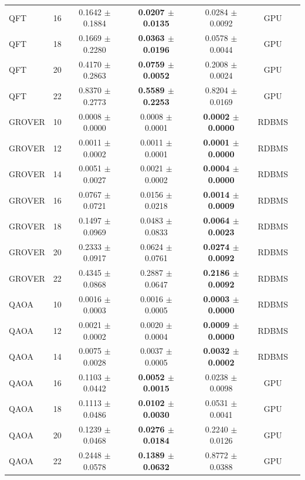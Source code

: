 \begin{table}[htbp]
\begin{tabular}{lcccccc}
QFT & 16 & 0.1642 $\pm$ 0.1884 & \textbf{0.0207 $\pm$ 0.0135} & 0.0284 $\pm$ 0.0092 & GPU \\
QFT & 18 & 0.1669 $\pm$ 0.2280 & \textbf{0.0363 $\pm$ 0.0196} & 0.0578 $\pm$ 0.0044 & GPU \\
QFT & 20 & 0.4170 $\pm$ 0.2863 & \textbf{0.0759 $\pm$ 0.0052} & 0.2008 $\pm$ 0.0024 & GPU \\
QFT & 22 & 0.8370 $\pm$ 0.2773 & \textbf{0.5589 $\pm$ 0.2253} & 0.8204 $\pm$ 0.0169 & GPU \\
GROVER & 10 & 0.0008 $\pm$ 0.0000 & 0.0008 $\pm$ 0.0001 & \textbf{0.0002 $\pm$ 0.0000} & RDBMS \\
GROVER & 12 & 0.0011 $\pm$ 0.0002 & 0.0011 $\pm$ 0.0001 & \textbf{0.0001 $\pm$ 0.0000} & RDBMS \\
GROVER & 14 & 0.0051 $\pm$ 0.0027 & 0.0021 $\pm$ 0.0002 & \textbf{0.0004 $\pm$ 0.0000} & RDBMS \\
GROVER & 16 & 0.0767 $\pm$ 0.0721 & 0.0156 $\pm$ 0.0218 & \textbf{0.0014 $\pm$ 0.0009} & RDBMS \\
GROVER & 18 & 0.1497 $\pm$ 0.0969 & 0.0483 $\pm$ 0.0833 & \textbf{0.0064 $\pm$ 0.0023} & RDBMS \\
GROVER & 20 & 0.2333 $\pm$ 0.0917 & 0.0624 $\pm$ 0.0761 & \textbf{0.0274 $\pm$ 0.0092} & RDBMS \\
GROVER & 22 & 0.4345 $\pm$ 0.0868 & 0.2887 $\pm$ 0.0647 & \textbf{0.2186 $\pm$ 0.0092} & RDBMS \\
QAOA & 10 & 0.0016 $\pm$ 0.0003 & 0.0016 $\pm$ 0.0005 & \textbf{0.0003 $\pm$ 0.0000} & RDBMS \\
QAOA & 12 & 0.0021 $\pm$ 0.0002 & 0.0020 $\pm$ 0.0004 & \textbf{0.0009 $\pm$ 0.0000} & RDBMS \\
QAOA & 14 & 0.0075 $\pm$ 0.0028 & 0.0037 $\pm$ 0.0005 & \textbf{0.0032 $\pm$ 0.0002} & RDBMS \\
QAOA & 16 & 0.1103 $\pm$ 0.0442 & \textbf{0.0052 $\pm$ 0.0015} & 0.0238 $\pm$ 0.0098 & GPU \\
QAOA & 18 & 0.1113 $\pm$ 0.0486 & \textbf{0.0102 $\pm$ 0.0030} & 0.0531 $\pm$ 0.0041 & GPU \\
QAOA & 20 & 0.1239 $\pm$ 0.0468 & \textbf{0.0276 $\pm$ 0.0184} & 0.2240 $\pm$ 0.0126 & GPU \\
QAOA & 22 & 0.2448 $\pm$ 0.0578 & \textbf{0.1389 $\pm$ 0.0632} & 0.8772 $\pm$ 0.0388 & GPU \\

\bottomrule
\end{tabular}
\end{table}
